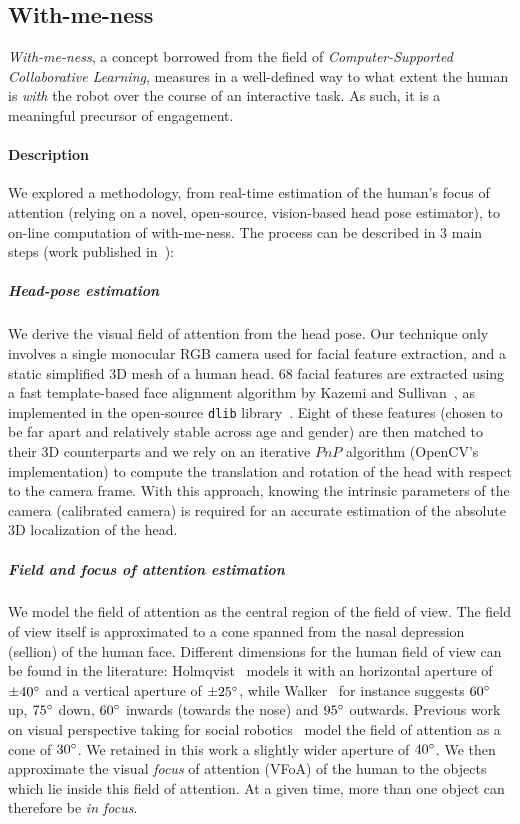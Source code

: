 \documentclass[10pt,a4paper]{article}
\begin{document}
\subsection{With-me-ness}\label{with}
\emph{With-me-ness}, a concept borrowed from the
field of {\it Computer-Supported Collaborative Learning}, measures in a
well-defined way to what extent the human is \emph{with} the robot over the
course of an interactive task. As such, it is a meaningful precursor of
engagement. 
\paragraph{Description}
We explored a methodology, from real-time
estimation of the human's focus of attention (relying on a novel, open-source,
vision-based head pose estimator), to on-line computation of with-me-ness. The process can be described in 3 main steps (work published in~\cite{lemaignan2016realtime}):

\subparagraph{Head-pose estimation}
We derive the visual field of attention from the head pose. Our
technique only involves a single monocular RGB camera used for facial feature
extraction, and a static simplified 3D mesh of a human head.  68 facial features
are extracted using a fast template-based face alignment algorithm by Kazemi and
Sullivan~\cite{kazemi2014one}, as implemented in the open-source {\tt dlib}
library~\cite{dlib09}.  Eight of these features (chosen to be far apart and
relatively stable across age and gender) are then matched to their 3D
counterparts and we rely on an iterative $PnP$
algorithm (OpenCV's implementation) to compute the translation and rotation of
the head with respect to the camera frame. With this approach, knowing the
intrinsic parameters of the camera (calibrated camera) is required for an
accurate estimation of the absolute 3D localization of the head.

\subparagraph{Field and focus of attention estimation}
We model the field of attention as the central region of the field of view.  The
field of view itself is approximated to a cone spanned from the nasal depression
(sellion) of the human face. Different dimensions for the human field of view
can be found in the literature: Holmqvist~\cite{holmqvist2011eye} models it
with an horizontal aperture of $ \pm 40\degree $ and a vertical aperture of $
\pm 25\degree $, while Walker~\cite{walker1980clinical} for instance suggests
$60\degree$ up, $75\degree$ down, $60\degree$ inwards (towards the nose) and
$95\degree$ outwards.  Previous work on visual perspective taking for social
robotics~\cite{sisbot2011situation} model the field of attention as a cone of
$30\degree$. We retained in this work a slightly wider aperture of $40\degree$.
We then approximate the visual \emph{focus} of attention (VFoA) of the human to
the objects which lie inside this field of attention. At
a given time, more than one object can therefore be \emph{in focus}.
\end{document}
